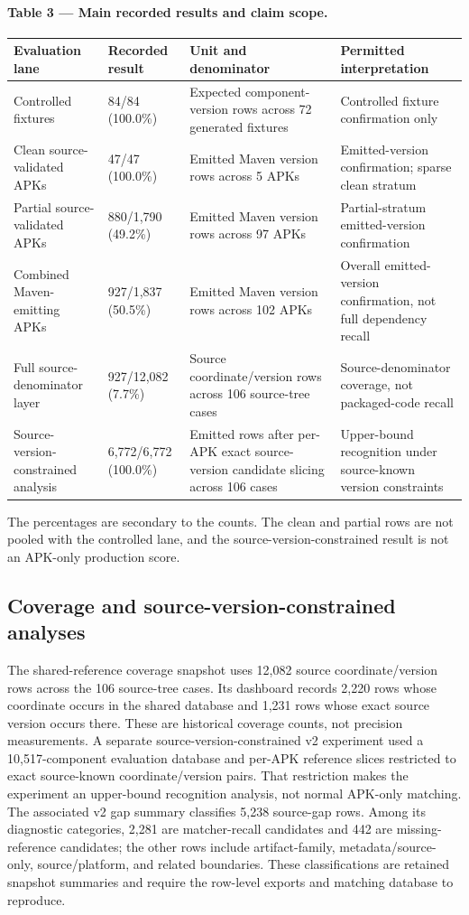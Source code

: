 \documentclass[10pt,twocolumn]{article}
\begin{document}
\paragraph{Table 3 — Main recorded results and claim scope.}
\begin{center}\small\begin{tabularx}{\columnwidth}{@{}X@{}X@{}X@{}X@{}}
\textbf{Evaluation lane} & \textbf{Recorded result} & \textbf{Unit and denominator} & \textbf{Permitted interpretation} \\
\midrule
Controlled fixtures & 84/84 (100.0\%) & Expected component-version rows across 72 generated fixtures & Controlled fixture confirmation only \\
Clean source-validated APKs & 47/47 (100.0\%) & Emitted Maven version rows across 5 APKs & Emitted-version confirmation; sparse clean stratum \\
Partial source-validated APKs & 880/1,790 (49.2\%) & Emitted Maven version rows across 97 APKs & Partial-stratum emitted-version confirmation \\
Combined Maven-emitting APKs & 927/1,837 (50.5\%) & Emitted Maven version rows across 102 APKs & Overall emitted-version confirmation, not full dependency recall \\
Full source-denominator layer & 927/12,082 (7.7\%) & Source coordinate/version rows across 106 source-tree cases & Source-denominator coverage, not packaged-code recall \\
Source-version-constrained analysis & 6,772/6,772 (100.0\%) & Emitted rows after per-APK exact source-version candidate slicing across 106 cases & Upper-bound recognition under source-known version constraints \\
\end{tabularx}\end{center}
The percentages are secondary to the counts. The clean and partial rows are not pooled with the controlled lane, and the source-version-constrained result is not an APK-only production score.
\subsection{Coverage and source-version-constrained analyses}
The shared-reference coverage snapshot uses 12,082 source coordinate/version rows across the 106 source-tree cases. Its dashboard records 2,220 rows whose coordinate occurs in the shared database and 1,231 rows whose exact source version occurs there. These are historical coverage counts, not precision measurements. A separate source-version-constrained v2 experiment used a 10,517-component evaluation database and per-APK reference slices restricted to exact source-known coordinate/version pairs. That restriction makes the experiment an upper-bound recognition analysis, not normal APK-only matching.
The associated v2 gap summary classifies 5,238 source-gap rows. Among its diagnostic categories, 2,281 are matcher-recall candidates and 442 are missing-reference candidates; the other rows include artifact-family, metadata/source-only, source/platform, and related boundaries. These classifications are retained snapshot summaries and require the row-level exports and matching database to reproduce.
\end{document}
